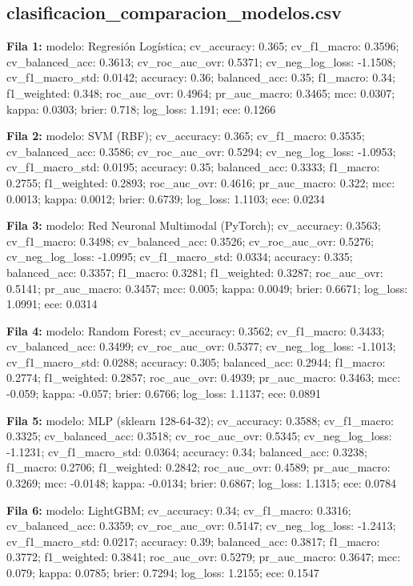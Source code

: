 \subsection*{clasificacion\_comparacion\_modelos.csv}
{\footnotesize\textbf{Fila 1:} modelo: Regresión Logística; cv\_accuracy: 0.365; cv\_f1\_macro: 0.3596; cv\_balanced\_acc: 0.3613; cv\_roc\_auc\_ovr: 0.5371; cv\_neg\_log\_loss: -1.1508; cv\_f1\_macro\_std: 0.0142; accuracy: 0.36; balanced\_acc: 0.35; f1\_macro: 0.34; f1\_weighted: 0.348; roc\_auc\_ovr: 0.4964; pr\_auc\_macro: 0.3465; mcc: 0.0307; kappa: 0.0303; brier: 0.718; log\_loss: 1.191; ece: 0.1266\par}
{\footnotesize\textbf{Fila 2:} modelo: SVM (RBF); cv\_accuracy: 0.365; cv\_f1\_macro: 0.3535; cv\_balanced\_acc: 0.3586; cv\_roc\_auc\_ovr: 0.5294; cv\_neg\_log\_loss: -1.0953; cv\_f1\_macro\_std: 0.0195; accuracy: 0.35; balanced\_acc: 0.3333; f1\_macro: 0.2755; f1\_weighted: 0.2893; roc\_auc\_ovr: 0.4616; pr\_auc\_macro: 0.322; mcc: 0.0013; kappa: 0.0012; brier: 0.6739; log\_loss: 1.1103; ece: 0.0234\par}
{\footnotesize\textbf{Fila 3:} modelo: Red Neuronal Multimodal (PyTorch); cv\_accuracy: 0.3563; cv\_f1\_macro: 0.3498; cv\_balanced\_acc: 0.3526; cv\_roc\_auc\_ovr: 0.5276; cv\_neg\_log\_loss: -1.0995; cv\_f1\_macro\_std: 0.0334; accuracy: 0.335; balanced\_acc: 0.3357; f1\_macro: 0.3281; f1\_weighted: 0.3287; roc\_auc\_ovr: 0.5141; pr\_auc\_macro: 0.3457; mcc: 0.005; kappa: 0.0049; brier: 0.6671; log\_loss: 1.0991; ece: 0.0314\par}
{\footnotesize\textbf{Fila 4:} modelo: Random Forest; cv\_accuracy: 0.3562; cv\_f1\_macro: 0.3433; cv\_balanced\_acc: 0.3499; cv\_roc\_auc\_ovr: 0.5377; cv\_neg\_log\_loss: -1.1013; cv\_f1\_macro\_std: 0.0288; accuracy: 0.305; balanced\_acc: 0.2944; f1\_macro: 0.2774; f1\_weighted: 0.2857; roc\_auc\_ovr: 0.4939; pr\_auc\_macro: 0.3463; mcc: -0.059; kappa: -0.057; brier: 0.6766; log\_loss: 1.1137; ece: 0.0891\par}
{\footnotesize\textbf{Fila 5:} modelo: MLP (sklearn 128-64-32); cv\_accuracy: 0.3588; cv\_f1\_macro: 0.3325; cv\_balanced\_acc: 0.3518; cv\_roc\_auc\_ovr: 0.5345; cv\_neg\_log\_loss: -1.1231; cv\_f1\_macro\_std: 0.0364; accuracy: 0.34; balanced\_acc: 0.3238; f1\_macro: 0.2706; f1\_weighted: 0.2842; roc\_auc\_ovr: 0.4589; pr\_auc\_macro: 0.3269; mcc: -0.0148; kappa: -0.0134; brier: 0.6867; log\_loss: 1.1315; ece: 0.0784\par}
{\footnotesize\textbf{Fila 6:} modelo: LightGBM; cv\_accuracy: 0.34; cv\_f1\_macro: 0.3316; cv\_balanced\_acc: 0.3359; cv\_roc\_auc\_ovr: 0.5147; cv\_neg\_log\_loss: -1.2413; cv\_f1\_macro\_std: 0.0217; accuracy: 0.39; balanced\_acc: 0.3817; f1\_macro: 0.3772; f1\_weighted: 0.3841; roc\_auc\_ovr: 0.5279; pr\_auc\_macro: 0.3647; mcc: 0.079; kappa: 0.0785; brier: 0.7294; log\_loss: 1.2155; ece: 0.1547\par}
